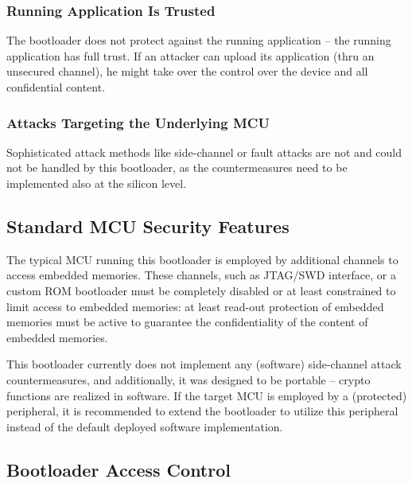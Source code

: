 
\subsubsection*{Running Application Is Trusted}

The bootloader does not protect against the running application -- the running application has full trust. 
If an attacker can upload its application (thru an unsecured channel), he might take over the control over the device and all confidential content.

\subsubsection*{Attacks Targeting the Underlying MCU}

Sophisticated attack methods like side-channel or fault attacks are not and could not be handled by this bootloader,
as the countermeasures need to be implemented also at the silicon level.

\subsection{Standard MCU Security Features} \label{sec:security:mcu}
 
The typical MCU running this bootloader is employed by additional channels to access embedded memories. These channels, such as JTAG/SWD interface, 
or a custom ROM bootloader must be completely disabled or at least constrained to limit access to embedded memories: 
at least read-out protection of embedded memories must be active to guarantee the confidentiality of the content of embedded memories.

This bootloader currently does not implement any (software) side-channel attack countermeasures, 
and additionally, it was designed to be portable -- crypto functions are realized in software. If the target MCU is employed by a (protected) peripheral, 
it is recommended to extend the bootloader to utilize this peripheral instead of the default deployed software implementation. 

\subsection{Bootloader Access Control} \label{sec:security:access}

